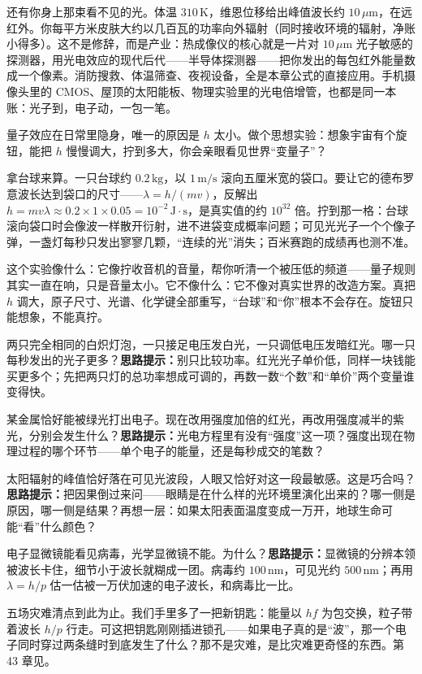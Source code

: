 还有你身上那束看不见的光。体温 \(310\,\mathrm{K}\)，维恩位移给出峰值波长约 \(10\,\mu\mathrm{m}\)，在远红外。你每平方米皮肤大约以几百瓦的功率向外辐射（同时接收环境的辐射，净账小得多）。这不是修辞，而是产业：热成像仪的核心就是一片对 \(10\,\mu\mathrm{m}\) 光子敏感的探测器，用光电效应的现代后代——半导体探测器——把你发出的每包红外能量数成一个像素。消防搜救、体温筛查、夜视设备，全是本章公式的直接应用。手机摄像头里的 CMOS、屋顶的太阳能板、物理实验里的光电倍增管，也都是同一本账：光子到，电子动，一包一笔。


\begin{thought}[把普朗克常数的旋钮慢慢拧大]
量子效应在日常里隐身，唯一的原因是 \(h\) 太小。做个思想实验：想象宇宙有个旋钮，能把 \(h\) 慢慢调大，拧到多大，你会亲眼看见世界“变量子”？

拿台球来算。一只台球约 \(0.2\,\mathrm{kg}\)，以 \(1\,\mathrm{m/s}\) 滚向五厘米宽的袋口。要让它的德布罗意波长达到袋口的尺寸——\(\lambda = h/(mv)\)，反解出 \(h = mv\lambda \approx 0.2\times1\times0.05 = 10^{-2}\,\mathrm{J\cdot s}\)，是真实值的约 \(10^{32}\) 倍。拧到那一格：台球滚向袋口时会像波一样散开衍射，进不进袋变成概率问题；可见光光子一个个像子弹，一盏灯每秒只发出寥寥几颗，“连续的光”消失；百米赛跑的成绩再也测不准。

这个实验像什么：它像拧收音机的音量，帮你听清一个被压低的频道——量子规则其实一直在响，只是音量太小。它不像什么：它不像对真实世界的改造方案。真把 \(h\) 调大，原子尺寸、光谱、化学键全部重写，“台球”和“你”根本不会存在。旋钮只能想象，不能真拧。
\end{thought}

\begin{puzzles}
\item 两只完全相同的白炽灯泡，一只接足电压发白光，一只调低电压发暗红光。哪一只每秒发出的光子更多？\textbf{思路提示：}别只比较功率。红光光子单价低，同样一块钱能买更多个；先把两只灯的总功率想成可调的，再数一数“个数”和“单价”两个变量谁变得快。
\item 某金属恰好能被绿光打出电子。现在改用强度加倍的红光，再改用强度减半的紫光，分别会发生什么？\textbf{思路提示：}光电方程里有没有“强度”这一项？强度出现在物理过程的哪个环节——单个电子的能量，还是每秒成交的笔数？
\item 太阳辐射的峰值恰好落在可见光波段，人眼又恰好对这一段最敏感。这是巧合吗？\textbf{思路提示：}把因果倒过来问——眼睛是在什么样的光环境里演化出来的？哪一侧是原因，哪一侧是结果？再想一层：如果太阳表面温度变成一万开，地球生命可能“看”什么颜色？
\item 电子显微镜能看见病毒，光学显微镜不能。为什么？\textbf{思路提示：}显微镜的分辨本领被波长卡住，细节小于波长就糊成一团。病毒约 \(100\,\mathrm{nm}\)，可见光约 \(500\,\mathrm{nm}\)；再用 \(\lambda = h/p\) 估一估被一万伏加速的电子波长，和病毒比一比。
\end{puzzles}

五场灾难清点到此为止。我们手里多了一把新钥匙：能量以 \(hf\) 为包交换，粒子带着波长 \(h/p\) 行走。可这把钥匙刚刚插进锁孔——如果电子真的是“波”，那一个电子同时穿过两条缝时到底发生了什么？那不是灾难，是比灾难更奇怪的东西。第 43 章见。
